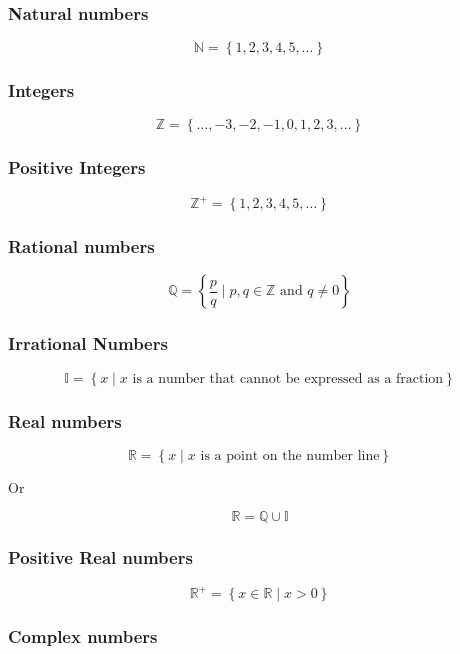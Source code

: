 \documentclass[12pt letter]{report}
\begin{document}
\subsubsection{Natural numbers}

\[
	\mathbb{N} = \left\{ 1, 2, 3, 4, 5, \ldots \right\}
\]

\subsubsection{Integers}

\[
	\mathbb{Z} = \left\{ \ldots, -3, -2, -1, 0, 1, 2, 3, \ldots \right\}
\]

\subsubsection{Positive Integers}

\[
	\mathbb{Z}^{+} = \left\{ 1, 2, 3, 4, 5, \ldots \right\}
\]

\subsubsection{Rational numbers}

\[
	\mathbb{Q} = \left\{ \frac{p}{q} \mid p, q \in \mathbb{Z} \text{ and } q \neq 0 \right\}
\]

\subsubsection{Irrational Numbers}
\[
	\mathbb{I} = \left\{ x \mid x \text{ is a number that cannot be expressed as a fraction} \right\}
\]

\subsubsection{Real numbers}

\[
	\mathbb{R} = \left\{ x \mid x \text{ is a point on the number line} \right\}
\]

Or

\[
	\mathbb{R} = \mathbb{Q} \cup \mathbb{I}
\]

\subsubsection{Positive Real numbers}
\[
	\mathbb{R}^{+} = \left\{ x \in \mathbb{R} \mid x > 0 \right\}
\]

\subsubsection{Complex numbers}
\end{document}
